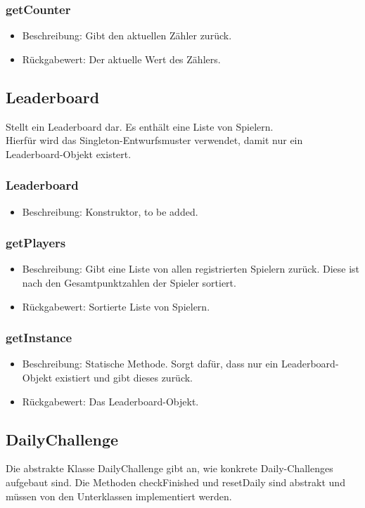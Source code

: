 \documentclass[a4paper]{scrreprt}
\begin{document}
	\subsubsection{getCounter}
	\begin{itemize}
		\item Beschreibung: Gibt den aktuellen Zähler zurück.
		\item Rückgabewert: Der aktuelle Wert des Zählers.
	\end{itemize}


	\subsection{Leaderboard}
	Stellt ein Leaderboard dar. Es enthält eine Liste von Spielern. \\
	Hierfür wird das Singleton-Entwurfsmuster verwendet, damit nur ein Leaderboard-Objekt existert.


	\subsubsection{Leaderboard}
	\begin{itemize}
		\item Beschreibung: Konstruktor, to be added.
	\end{itemize}
	\subsubsection{getPlayers}
	\begin{itemize}
		\item Beschreibung: Gibt eine Liste von allen registrierten Spielern zurück. Diese ist nach den Gesamtpunktzahlen der Spieler sortiert.
		\item Rückgabewert: Sortierte Liste von Spielern.
	\end{itemize}
	\subsubsection{getInstance}
	\begin{itemize}
		\item Beschreibung: Statische Methode. Sorgt dafür, dass nur ein Leaderboard-Objekt existiert und gibt dieses zurück.
		\item Rückgabewert: Das Leaderboard-Objekt.
	\end{itemize}


	\subsection{DailyChallenge}
	Die abstrakte Klasse DailyChallenge gibt an, wie konkrete Daily-Challenges aufgebaut sind. Die Methoden checkFinished und resetDaily sind abstrakt und müssen von den Unterklassen implementiert werden. \\
\end{document}
